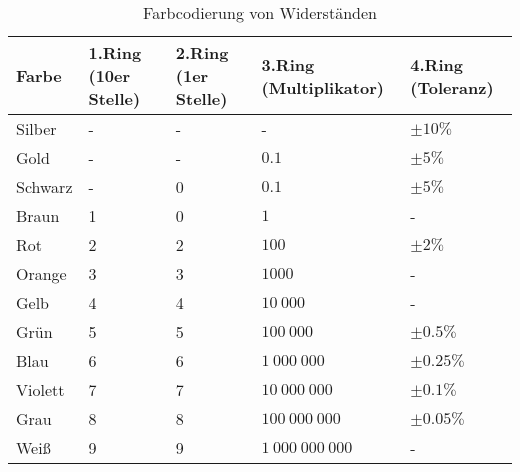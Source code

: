 \begin{table}[h]
    \begin{adjustwidth}{-2cm}{}
        \caption{Farbcodierung von Widerständen}
        \label{tab:farbcodierung-von-widerständen}
        \begin{tabular}{| l | l | l | l | l |}
            \hline
            Farbe   & 1.Ring (10er Stelle) & 2.Ring (1er Stelle) & 3.Ring (Multiplikator) & 4.Ring (Toleranz) \\
            \hline
            Silber  & -                    & -                   & -                      & $\pm 10\%$        \\
            Gold    & -                    & -                   & $0.1$                  & $\pm 5\%$         \\
            Schwarz & -                    & 0                   & $0.1$                  & $\pm 5\%$         \\
            Braun   & 1                    & 0                   & $1$                    & -                 \\
            Rot     & 2                    & 2                   & $100$                  & $\pm 2\%$         \\
            Orange  & 3                    & 3                   & $1000$                  & -                 \\
            Gelb    & 4                    & 4                   & $10\ 000$              & -                 \\
            Grün    & 5                    & 5                   & $100\ 000$             & $\pm 0.5\%$       \\
            Blau    & 6                    & 6                   & $1\ 000\ 000$          & $\pm 0.25\%$      \\
            Violett & 7                    & 7                   & $10\ 000\ 000$         & $\pm 0.1\%$       \\
            Grau    & 8                    & 8                   & $100\ 000\ 000$        & $\pm 0.05\%$      \\
            Weiß    & 9                    & 9                   & $1\ 000\ 000\ 000$     & -                 \\
            \hline
        \end{tabular}
    \end{adjustwidth}
\end{table}

\newpage

